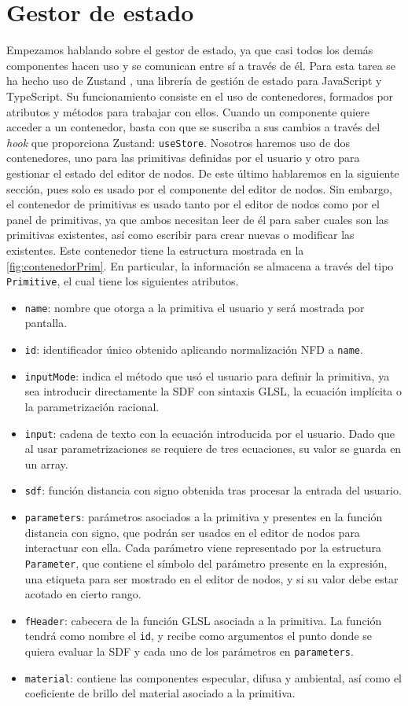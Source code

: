 \section{Gestor de estado}
Empezamos hablando sobre el gestor de estado, ya que casi todos los demás componentes hacen uso y se comunican entre sí a través de él. Para esta tarea se ha hecho uso de Zustand \cite{zustand}, una librería de gestión de estado para JavaScript y TypeScript. Su funcionamiento consiste en el uso de contenedores, formados por atributos y métodos para trabajar con ellos. Cuando un componente quiere acceder a un contenedor, basta con que se suscriba a sus cambios a través del \textit{hook} que proporciona Zustand: \texttt{useStore}. Nosotros haremos uso de dos contenedores, uno para las primitivas definidas por el usuario y otro para gestionar el estado del editor de nodos. De este último hablaremos en la siguiente sección, pues solo es usado por el componente del editor de nodos. Sin embargo, el contenedor de primitivas es usado tanto por el editor de nodos como por el panel de primitivas, ya que ambos necesitan leer de él para saber cuales son las primitivas existentes, así como escribir para crear nuevas o modificar las existentes. Este contenedor tiene la estructura mostrada en la \autoref{fig:contenedorPrim}. En particular, la información se almacena a través del tipo \texttt{Primitive}, el cual tiene los siguientes atributos.
\begin{itemize}
    \item \texttt{name}: nombre que otorga a la primitiva el usuario y será mostrada por pantalla.
    \item \texttt{id}: identificador único obtenido aplicando normalización NFD a \texttt{name}.
    \item \texttt{inputMode}: indica el método que usó el usuario para definir la primitiva, ya sea introducir directamente la SDF con sintaxis GLSL, la ecuación implícita o la parametrización racional.
    \item \texttt{input}: cadena de texto con la ecuación introducida por el usuario. Dado que al usar parametrizaciones se requiere de tres ecuaciones, su valor se guarda en un array.
    \item \texttt{sdf}: función distancia con signo obtenida tras procesar la entrada del usuario.
    \item \texttt{parameters}: parámetros asociados a la primitiva y presentes en la función distancia con signo, que podrán ser usados en el editor de nodos para interactuar con ella. Cada parámetro viene representado por la estructura \texttt{Parameter}, que contiene el símbolo del parámetro presente en la expresión, una etiqueta para ser mostrado en el editor de nodos, y si su valor debe estar acotado en cierto rango. 
    \item \texttt{fHeader}: cabecera de la función GLSL asociada a la primitiva. La función tendrá como nombre el \texttt{id}, y recibe como argumentos el punto donde se quiera evaluar la SDF y cada uno de los parámetros en \texttt{parameters}.
    \item \texttt{material}: contiene las componentes especular, difusa y ambiental, así como el coeficiente de brillo del material asociado a la primitiva.
\end{itemize}
